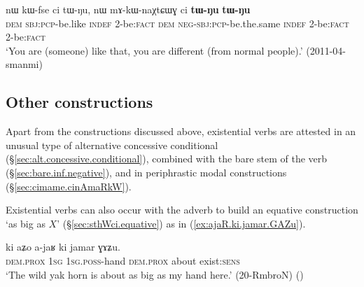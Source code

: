 \begin{exe}
\ex \label{ex:tWNu.tWNu}
\gll nɯ kɯ-fse ci tɯ-ŋu, nɯ mɤ-kɯ-naχtɕɯɣ ci \textbf{tɯ-ŋu} \textbf{tɯ-ŋu} \\
\textsc{dem} \textsc{sbj}:\textsc{pcp}-be.like \textsc{indef} 2-be:\textsc{fact} \textsc{dem} \textsc{neg}-\textsc{sbj}:\textsc{pcp}-be.the.same \textsc{indef} 2-be:\textsc{fact} 2-be:\textsc{fact} \\
\glt `You are (someone) like that, you are different (from normal people).' (2011-04-smanmi)
\end{exe}



\subsection{Other constructions}
Apart from the constructions discussed above, existential verbs are attested in an unusual type of alternative concessive conditional (§\ref{sec:alt.concessive.conditional}), combined with the bare stem of the verb (§\ref{sec:bare.inf.negative}), and in periphrastic modal constructions (§\ref{sec:cimame.cinAmaRkW}).
 
 Existential verbs can also occur with the adverb  to build an equative construction `as big as $X$' (§\ref{sec:sthWci.equative}) as in (\ref{ex:ajaR.ki.jamar.GAZu}).  

\begin{exe}
\ex \label{ex:ajaR.ki.jamar.GAZu}
\gll ki aʑo a-jaʁ ki jamar ɣɤʑu. \\
\textsc{dem}.\textsc{prox} \textsc{1sg} \textsc{1sg}.\textsc{poss}-hand \textsc{dem}.\textsc{prox} about exist:\textsc{sens} \\
\glt `The wild yak horn is about as big as my hand here.' (20-RmbroN)
()
 \end{exe}


